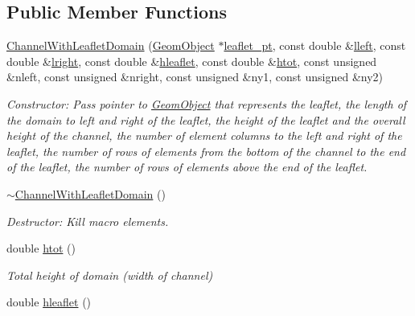 \subsection*{Public Member Functions}
\begin{DoxyCompactItemize}
\item 
\hyperlink{classoomph_1_1ChannelWithLeafletDomain_a6cca7d06136de0c76facec2a92b0939e}{Channel\+With\+Leaflet\+Domain} (\hyperlink{classoomph_1_1GeomObject}{Geom\+Object} $\ast$\hyperlink{classoomph_1_1ChannelWithLeafletDomain_a91d7d8d2f564c5e9d2ee07449b2653c9}{leaflet\+\_\+pt}, const double \&\hyperlink{classoomph_1_1ChannelWithLeafletDomain_a5538092062970dbd2f02218a05639d49}{lleft}, const double \&\hyperlink{classoomph_1_1ChannelWithLeafletDomain_aee74846110e70cd5538386e1ccb0ce7c}{lright}, const double \&\hyperlink{classoomph_1_1ChannelWithLeafletDomain_af70ada72d505ebea468d1000b04c20e1}{hleaflet}, const double \&\hyperlink{classoomph_1_1ChannelWithLeafletDomain_aaf195c688423473ed97af61f8a1467ab}{htot}, const unsigned \&nleft, const unsigned \&nright, const unsigned \&ny1, const unsigned \&ny2)
\begin{DoxyCompactList}\small\item\em Constructor\+: Pass pointer to \hyperlink{classoomph_1_1GeomObject}{Geom\+Object} that represents the leaflet, the length of the domain to left and right of the leaflet, the height of the leaflet and the overall height of the channel, the number of element columns to the left and right of the leaflet, the number of rows of elements from the bottom of the channel to the end of the leaflet, the number of rows of elements above the end of the leaflet. \end{DoxyCompactList}\item 
\hyperlink{classoomph_1_1ChannelWithLeafletDomain_a7f00e3d9ed53ca70519671446fe60510}{$\sim$\+Channel\+With\+Leaflet\+Domain} ()
\begin{DoxyCompactList}\small\item\em Destructor\+: Kill macro elements. \end{DoxyCompactList}\item 
double \hyperlink{classoomph_1_1ChannelWithLeafletDomain_aaf195c688423473ed97af61f8a1467ab}{htot} ()
\begin{DoxyCompactList}\small\item\em Total height of domain (width of channel) \end{DoxyCompactList}\item 
double \hyperlink{classoomph_1_1ChannelWithLeafletDomain_af70ada72d505ebea468d1000b04c20e1}{hleaflet} ()

\end{DoxyCompactItemize}
